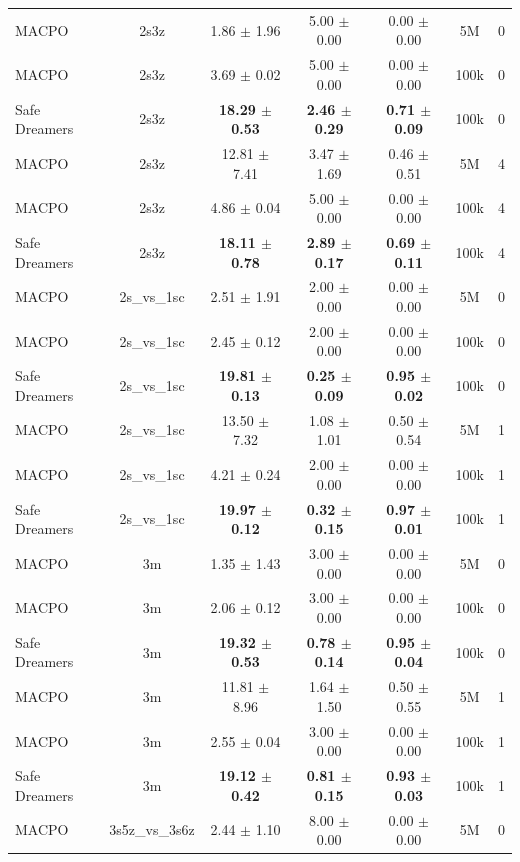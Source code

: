 \begin{longtable}{lcccccc}
\midrule
MACPO & 2s3z & 1.86 $\pm$ 1.96 & 5.00 $\pm$ 0.00 & 0.00 $\pm$ 0.00 & 5M & 0 \\
MACPO & 2s3z & 3.69 $\pm$ 0.02 & 5.00 $\pm$ 0.00 & 0.00 $\pm$ 0.00 & 100k & 0 \\
Safe Dreamers & 2s3z & \textbf{18.29 $\pm$ 0.53} & \textbf{2.46 $\pm$ 0.29} & \textbf{0.71 $\pm$ 0.09} & 100k & 0 \\
\midrule
MACPO & 2s3z & 12.81 $\pm$ 7.41 & 3.47 $\pm$ 1.69 & 0.46 $\pm$ 0.51 & 5M & 4 \\
MACPO & 2s3z & 4.86 $\pm$ 0.04 & 5.00 $\pm$ 0.00 & 0.00 $\pm$ 0.00 & 100k & 4 \\
Safe Dreamers & 2s3z & \textbf{18.11 $\pm$ 0.78} & \textbf{2.89 $\pm$ 0.17} & \textbf{0.69 $\pm$ 0.11} & 100k & 4 \\
\midrule
MACPO & 2s\_vs\_1sc & 2.51 $\pm$ 1.91 & 2.00 $\pm$ 0.00 & 0.00 $\pm$ 0.00 & 5M & 0 \\
MACPO & 2s\_vs\_1sc & 2.45 $\pm$ 0.12 & 2.00 $\pm$ 0.00 & 0.00 $\pm$ 0.00 & 100k & 0 \\
Safe Dreamers & 2s\_vs\_1sc & \textbf{19.81 $\pm$ 0.13} & \textbf{0.25 $\pm$ 0.09} & \textbf{0.95 $\pm$ 0.02} & 100k & 0 \\
\midrule
MACPO & 2s\_vs\_1sc & 13.50 $\pm$ 7.32 & 1.08 $\pm$ 1.01 & 0.50 $\pm$ 0.54 & 5M & 1 \\
MACPO & 2s\_vs\_1sc & 4.21 $\pm$ 0.24 & 2.00 $\pm$ 0.00 & 0.00 $\pm$ 0.00 & 100k & 1 \\
Safe Dreamers & 2s\_vs\_1sc & \textbf{19.97 $\pm$ 0.12} & \textbf{0.32 $\pm$ 0.15} & \textbf{0.97 $\pm$ 0.01} & 100k & 1 \\
\midrule
MACPO & 3m & 1.35 $\pm$ 1.43 & 3.00 $\pm$ 0.00 & 0.00 $\pm$ 0.00 & 5M & 0 \\
MACPO & 3m & 2.06 $\pm$ 0.12 & 3.00 $\pm$ 0.00 & 0.00 $\pm$ 0.00 & 100k & 0 \\
Safe Dreamers & 3m & \textbf{19.32 $\pm$ 0.53} & \textbf{0.78 $\pm$ 0.14} & \textbf{0.95 $\pm$ 0.04} & 100k & 0 \\
\midrule
MACPO & 3m & 11.81 $\pm$ 8.96 & 1.64 $\pm$ 1.50 & 0.50 $\pm$ 0.55 & 5M & 1 \\
MACPO & 3m & 2.55 $\pm$ 0.04 & 3.00 $\pm$ 0.00 & 0.00 $\pm$ 0.00 & 100k & 1 \\
Safe Dreamers & 3m & \textbf{19.12 $\pm$ 0.42} & \textbf{0.81 $\pm$ 0.15} & \textbf{0.93 $\pm$ 0.03} & 100k & 1 \\
\midrule
MACPO & 3s5z\_vs\_3s6z & 2.44 $\pm$ 1.10 & 8.00 $\pm$ 0.00 & 0.00 $\pm$ 0.00 & 5M & 0 \\

\end{longtable}
